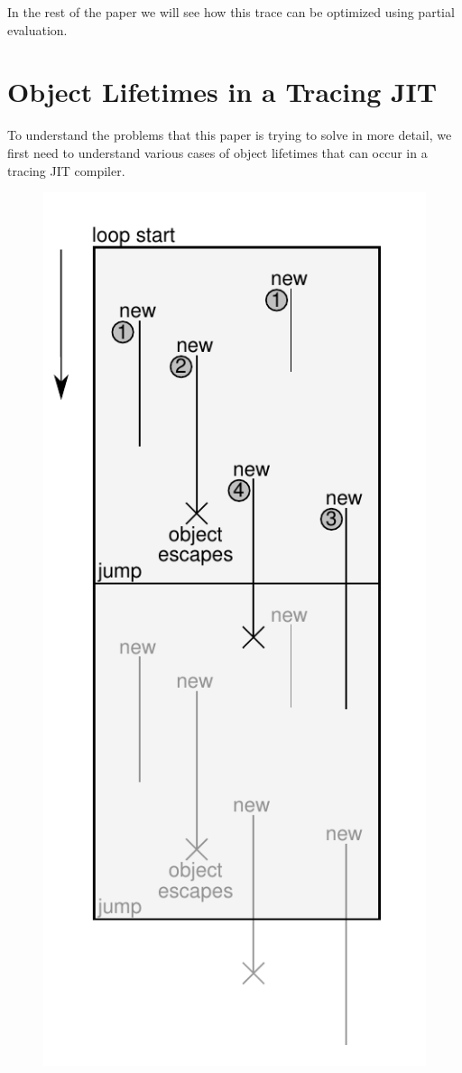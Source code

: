\documentclass{sigplanconf}
\begin{document}
In the rest of the paper we will see how this trace can be optimized using
partial evaluation.

\section{Object Lifetimes in a Tracing JIT}
\label{sec:lifetimes}


To understand the problems that this paper is trying to solve in more detail, we
first need to understand various cases of object lifetimes that can occur in a
tracing JIT compiler.

\begin{figure}
\begin{center}
\includegraphics[scale=0.6]{figures/obj-lifetime.pdf}
\end{center}


\end{figure}
\end{document}
